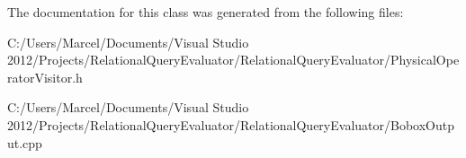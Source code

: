The documentation for this class was generated from the following files\+:\begin{DoxyCompactItemize}
\item 
C\+:/\+Users/\+Marcel/\+Documents/\+Visual Studio 2012/\+Projects/\+Relational\+Query\+Evaluator/\+Relational\+Query\+Evaluator/Physical\+Operator\+Visitor.\+h\item 
C\+:/\+Users/\+Marcel/\+Documents/\+Visual Studio 2012/\+Projects/\+Relational\+Query\+Evaluator/\+Relational\+Query\+Evaluator/Bobox\+Output.\+cpp\end{DoxyCompactItemize}
